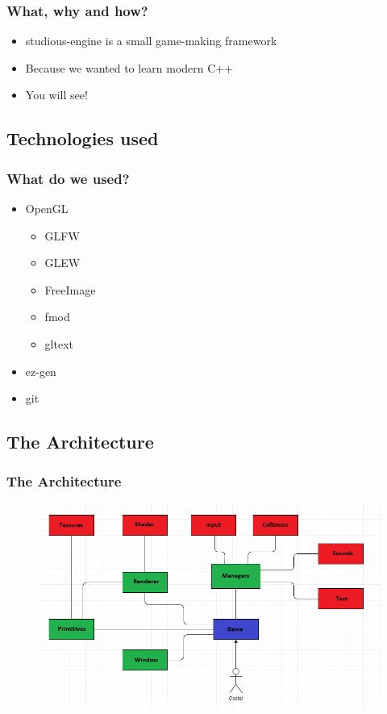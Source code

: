 \documentclass{beamer}
\begin{document}
\begin{frame}
\frametitle{What, why and how?}
\begin{itemize}
\item studious-engine is a small game-making framework
\item Because we wanted to learn modern C++
\item You will see!
\end{itemize}
\end{frame}

\subsection{Technologies used}
\begin{frame}
\frametitle{What do we used?}
\begin{itemize}
\item OpenGL
    \begin {itemize}
    \item GLFW
    \item GLEW
    \item FreeImage
    \item fmod
    \item gltext
    \end {itemize}
\item ez-gen
\item git
\end{itemize}
\end{frame}

\subsection{The Architecture}
\begin{frame}
\frametitle{The Architecture}
\begin{figure}
\includegraphics[width=\textwidth,height=0.7\textheight]{Studious-Engine_Diagram}
\end{figure}
\end{frame}
\end{document}
